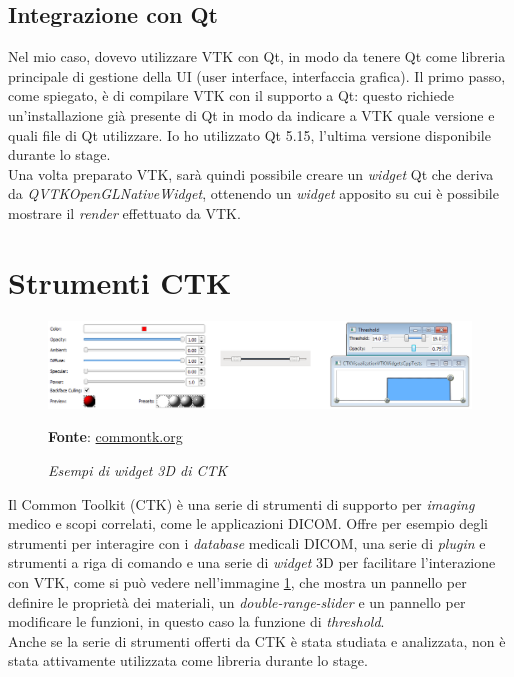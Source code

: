 \subsection{Integrazione con Qt}\label{sec:qt-integrazione}
Nel mio caso, dovevo utilizzare VTK con Qt, in modo da tenere Qt come libreria principale di gestione della UI (user interface, interfaccia grafica). Il primo passo, come spiegato, è di compilare VTK con il supporto a Qt: questo richiede un'installazione già presente di Qt in modo da indicare a VTK quale versione e quali file di Qt utilizzare. Io ho utilizzato Qt 5.15, l'ultima versione disponibile durante lo stage.\\
Una volta preparato VTK, sarà quindi possibile creare un \emph{widget} Qt che deriva da \emph{QVTKOpenGLNativeWidget}, ottenendo un \emph{widget} apposito su cui è possibile mostrare il \emph{render} effettuato da VTK.

\section{Strumenti CTK}
\begin{figure}[h]
    \centering
    \includegraphics[scale=0.35]{immagini/volumerendering/ctkwidgets.png}
    \caption{\textit{Esempi di widget 3D di CTK}}
    \textbf{Fonte}: \href{https://commontk.org/index.php/Documentation/ImageGallery}{commontk.org}
    \label{fig: CTK 3D Widgets}
\end{figure}

Il Common Toolkit (CTK) è una serie di strumenti di supporto per \emph{imaging} medico e scopi correlati, come le applicazioni DICOM. Offre per esempio degli strumenti per interagire con i \emph{database} medicali DICOM, una serie di \emph{plugin} e strumenti a riga di comando e una serie di \emph{widget} 3D per facilitare l'interazione con VTK, come si può vedere nell'immagine \ref{fig: CTK 3D Widgets}, che mostra un pannello per definire le proprietà dei materiali, un \emph{double-range-slider} e un pannello per modificare le funzioni, in questo caso la funzione di \emph{threshold}.
\\
Anche se la serie di strumenti offerti da CTK è stata studiata e analizzata, non è stata attivamente utilizzata come libreria durante lo stage.


